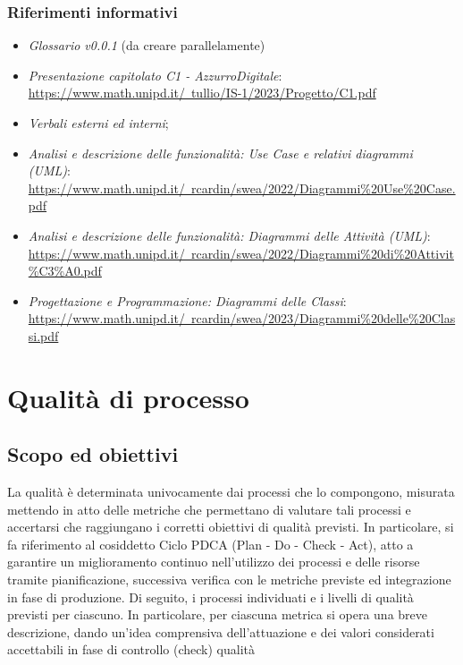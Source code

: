 \documentclass[10pt, a4paper]{article}
\begin{document}
    \subsubsection{Riferimenti informativi}
    
    \begin{itemize}
    \item \textit{Glossario v0.0.1} (da creare parallelamente) 
    \item \textit{Presentazione capitolato C1 - AzzurroDigitale}:\\
    \href{https://www.math.unipd.it/~tullio/IS-1/2023/Progetto/C1.pdf}{https://www.math.unipd.it/~tullio/IS-1/2023/Progetto/C1.pdf}
    \item \textit{Verbali esterni ed interni};
    \item \textit{Analisi e descrizione delle funzionalità: Use Case e relativi diagrammi (UML)}:\\
    \href{https://www.math.unipd.it/~rcardin/swea/2022/Diagrammi%20Use%20Case.pdf}{https://www.math.unipd.it/~rcardin/swea/2022/Diagrammi\%20Use\%20Case.pdf}
    \item \textit{Analisi e descrizione delle funzionalità: Diagrammi delle Attività (UML)}:\\
    \href{https://www.math.unipd.it/~rcardin/swea/2022/Diagrammi%20di%20Attivit%C3%A0.pdf}{https://www.math.unipd.it/~rcardin/swea/2022/Diagrammi\%20di\%20Attivit\%C3\%A0.pdf}
    \item \textit{Progettazione e Programmazione: Diagrammi delle Classi}:\\
    \href{https://www.math.unipd.it/~rcardin/swea/2023/Diagrammi%20delle%20Classi.pdf}{https://www.math.unipd.it/~rcardin/swea/2023/Diagrammi\%20delle\%20Classi.pdf}
    \end{itemize}

\newpage
\section{Qualità di processo}
\subsection{Scopo ed obiettivi}
La qualità è determinata univocamente dai processi che lo compongono, misurata mettendo in atto 
delle metriche che permettano di valutare tali processi e accertarsi che raggiungano i corretti 
obiettivi di qualità previsti. In particolare, si fa riferimento al cosiddetto Ciclo PDCA (Plan - Do - Check 
- Act), atto a garantire un miglioramento continuo nell'utilizzo dei processi e delle risorse tramite 
pianificazione, successiva verifica con le metriche previste ed integrazione in fase di produzione. Di 
seguito, i processi individuati e i livelli di qualità previsti per ciascuno.
In particolare, per ciascuna metrica si opera una breve descrizione, dando un'idea comprensiva 
dell'attuazione e dei valori considerati accettabili in fase di controllo (check) qualità
\end{document}
